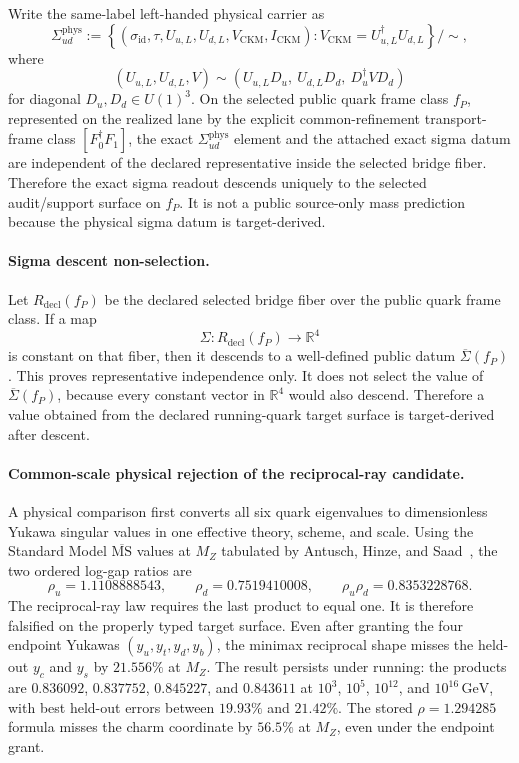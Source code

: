 \documentclass[11pt]{article}
\begin{document}
Write the same-label left-handed physical carrier as
\[
\Sigma_{ud}^{\mathrm{phys}}
:=
\left\{
(\sigma_{\mathrm{id}},\tau,U_{u,L},U_{d,L},V_{\mathrm{CKM}},I_{\mathrm{CKM}})
:
V_{\mathrm{CKM}}=U_{u,L}^\dagger U_{d,L}
\right\}/\!\sim,
\]
where
\[
(U_{u,L},U_{d,L},V)\sim
(U_{u,L}D_u,\ U_{d,L}D_d,\ D_u^\dagger V D_d)
\]
for diagonal \(D_u,D_d\in U(1)^3\). On the selected public quark frame class \(f_P\),
represented on the realized lane by the explicit common-refinement transport-frame class
\([F_0^\dagger F_1]\), the exact \(\Sigma_{ud}^{\mathrm{phys}}\) element and the attached exact
sigma datum are independent of the declared representative inside the selected bridge fiber.
Therefore the exact sigma readout descends uniquely to the selected audit/support surface on
\(f_P\). It is not a public source-only mass prediction because the physical sigma datum is
target-derived.

\paragraph{Sigma descent non-selection.}
Let \(R_{\mathrm{decl}}(f_P)\) be the declared selected bridge fiber over the public quark
frame class. If a map
\[
\Sigma:R_{\mathrm{decl}}(f_P)\to\mathbb R^4
\]
is constant on that fiber, then it descends to a well-defined public datum
\(\overline\Sigma(f_P)\). This proves representative independence only. It does not select the
value of \(\overline\Sigma(f_P)\), because every constant vector in \(\mathbb R^4\) would also
descend. Therefore a value obtained from the declared running-quark target surface is
target-derived after descent.

\paragraph{Common-scale physical rejection of the reciprocal-ray candidate.}
A physical comparison first converts all six quark eigenvalues to dimensionless Yukawa singular
values in one effective theory, scheme, and scale. Using the Standard Model
\(\overline{\mathrm{MS}}\) values at \(M_Z\) tabulated by Antusch, Hinze, and
Saad~\cite{antusch2025running}, the two ordered log-gap ratios are
\[
\rho_u=1.1108888543,
\qquad
\rho_d=0.7519410008,
\qquad
\rho_u\rho_d=0.8353228768.
\]
The reciprocal-ray law requires the last product to equal one. It is therefore falsified on the
properly typed target surface. Even after granting the four endpoint Yukawas
\((y_u,y_t,y_d,y_b)\), the minimax reciprocal shape misses the held-out \(y_c\) and \(y_s\) by
\(21.556\%\) at \(M_Z\). The result persists under running: the products are
\(0.836092\), \(0.837752\), \(0.845227\), and \(0.843611\) at
\(10^3\), \(10^5\), \(10^{12}\), and \(10^{16}\,\mathrm{GeV}\), with best held-out errors
between \(19.93\%\) and \(21.42\%\). The stored \(\rho=1.294285\) formula misses the charm
coordinate by \(56.5\%\) at \(M_Z\), even under the endpoint grant.
\end{document}
